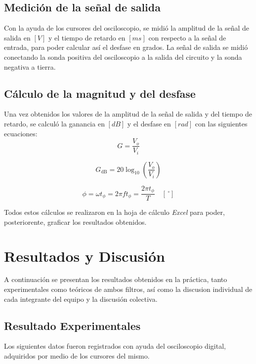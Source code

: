 \documentclass{article}
\begin{document}
\subsection{Medición de la señal de salida}
Con la ayuda de los cursores del osciloscopio, se midió la amplitud de la señal de salida
en $[V]$ y el tiempo de retardo en $[ms]$ con respecto a la señal de entrada, para poder
calcular así el desfase en grados. La señal de salida se midió conectando la sonda positiva
del osciloscopio a la salida del circuito y la sonda negativa a tierra.

\subsection{Cálculo de la magnitud y del desfase}
Una vez obtenidos los valores de la amplitud de la señal de salida y del tiempo de retardo, 
se calculó la ganancia en $[dB]$ y el desfase en $[rad]$ con las siguientes ecuaciones:
\begin{equation}
    G = \frac{V_o}{V_i}
    \label{eq:ganancia}
\end{equation}

\begin{equation}
    G_{\mathrm{dB}} = 20\log_{10}\left(\frac{V_o}{V_i}\right)
    \label{eq:ganancia_db}
\end{equation}

\begin{equation}
    \phi = \omega t_{\phi}
    = 2\pi f t_{\phi}
    = \frac{2\pi t_{\phi}}{T}
    \quad [\,{^\circ}]
    \label{eq:desfase_rad}
\end{equation}

Todos estos cálculos se realizaron en la hoja de cálculo \textit{Excel} 
para poder, posteriorente, graficar los resultados obtenidos.


\section{Resultados y Discusión}
A continuación se presentan los resultados obtenidos en la práctica, 
tanto experimentales como teóricos de ambos filtros, así como la 
discusion individual de cada integrante del equipo y la discusión 
colectiva.

\subsection{Resultado Experimentales}
Los siguientes datos fueron registrados con ayuda del osciloscopio 
digital, adquiridos por medio de los cursores del mismo.
\end{document}
